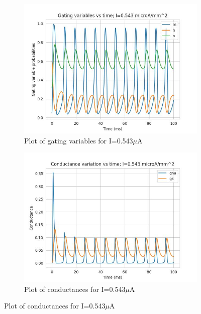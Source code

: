 \documentclass{article}
\begin{document}
\begin{figure}[h]
    \begin{subfigure}[b]{0.45\textwidth}
        \includegraphics[width=1.5\textwidth]{11.jpg}
        \caption{Plot of gating variables for I=0.543$\mu$A}
        \label{fig:IO2}
    \end{subfigure}
    \begin{subfigure}[b]{0.45\textwidth}
        \includegraphics[width=1.5\textwidth]{12.jpg}
        \caption{Plot of conductances for I=0.543$\mu$A}
        \label{fig:IO2}
    \end{subfigure}
\end{figure}
\newpage
\end{document}
